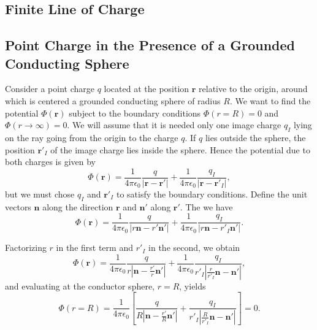 \subsection{ Finite Line of Charge}


\subsection{ Point Charge in the Presence of a Grounded Conducting Sphere}

Consider a point charge $q$ located at the position $\textbf{r}$ relative to the origin, around which is centered a grounded conducting sphere of radius $R$. We want to find the potential $\Phi(\textbf{r})$ subject to the boundary conditions $\Phi (r=R) =0$ and $\Phi (r\rightarrow \infty) =0$. We will assume that it is needed only one image charge $q_I$ lying on the ray going from the origin to the charge $q$. If $q$ lies outside the sphere, the position $\textbf{r}'_I$ of the image charge lies inside the sphere. Hence the potential due to both charges is given by
\begin{equation}
\Phi (\textbf{r}) = \frac{1}{4\pi \epsilon_0} \frac{q}{\left| \textbf{r} - \textbf{r}' \right|} + \frac{1}{4\pi \epsilon_0} \frac{q_I}{\left| \textbf{r} - \textbf{r}'_I \right|}, \label{ImageExample1}
\end{equation}
but we must chose $q_I$ and $\textbf{r}'_I$ to satisfy the boundary conditions. Define the unit vectors $\textbf{n}$ along the direction $\textbf{r}$ and $\textbf{n}'$ along $\textbf{r}'$. The we have  
\begin{equation}
\Phi (\textbf{r}) = \frac{1}{4\pi \epsilon_0} \frac{q}{\left| r \textbf{n} - r' \textbf{n}' \right|} + \frac{1}{4\pi \epsilon_0} \frac{q_I}{\left| r \textbf{n} - r'_I \textbf{n}' \right|}.  
\end{equation}

Factorizing $r$ in the first term and $r'_I$ in the second, we obtain
\begin{equation}
\Phi (\textbf{r}) = \frac{1}{4\pi \epsilon_0} \frac{q}{r \left|  \textbf{n} -\frac{ r'}{r} \textbf{n}' \right|} + \frac{1}{4\pi \epsilon_0} \frac{q_I}{r'_I\left| \frac{r}{r'_I} \textbf{n} - \textbf{n}' \right|},
\end{equation}
and evaluating at the conductor sphere, $r=R$, yields
\begin{equation}
\Phi (r=R) = \frac{1}{4\pi \epsilon_0} \left[ \frac{q}{R \left|  \textbf{n} -\frac{ r'}{R} \textbf{n}' \right|} + \frac{q_I}{r'_I\left| \frac{R}{r'_I} \textbf{n} - \textbf{n}' \right|} \right] = 0.
\end{equation}

